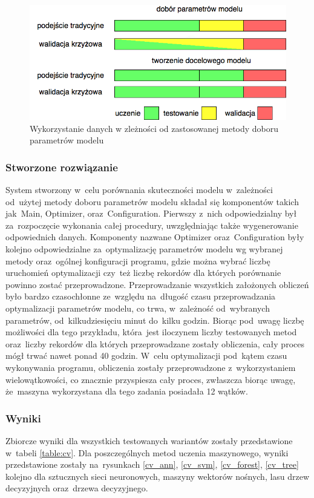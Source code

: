 \begin{figure}[ht!]
\centering
\includegraphics[scale=0.6]{res/cvdata.png}
\caption[Caption for LOF]{Wykorzystanie danych w zleżności od zastosowanej metody doboru parametrów modelu\label{cvdata}}
\end{figure} 

\subsubsection{Stworzone rozwiązanie}
System stworzony w~celu porównania skuteczności modelu w~zależności od~użytej metody doboru parametrów modelu składał się komponentów takich jak~Main, Optimizer, oraz~Configuration. Pierwszy z~nich odpowiedzialny był za~rozpoczęcie wykonania całej procedury, uwzględniając także wygenerowanie odpowiednich danych. Komponenty nazwane Optimizer oraz~Configuration były kolejno odpowiedzialne za~optymalizację parametrów modelu wg wybranej metody oraz~ogólnej konfiguracji programu, gdzie można wybrać liczbę uruchomień optymalizacji czy~też liczbę rekordów dla których porównanie powinno zostać przeprowadzone. Przeprowadzanie wszystkich założonych obliczeń było bardzo czasochłonne ze~względu na~długość czasu przeprowadzania optymalizacji parametrów modelu, co trwa, w~zależność od~wybranych parametrów, od~kilkudziesięciu minut do~kilku godzin. Biorąc pod~uwagę liczbę możliwości dla tego przykładu, która~jest iloczynem liczby testowanych metod oraz~liczby rekordów dla których przeprowadzane zostały obliczenia, cały proces mógł trwać nawet ponad 40 godzin. W~celu optymalizacji pod~kątem czasu wykonywania programu, obliczenia zostały przeprowadzone z~wykorzystaniem wielowątkowości, co znacznie przyspiesza cały proces, zwłaszcza biorąc uwagę, że~maszyna wykorzystana dla tego zadania posiadała 12 wątków. 
 
\subsubsection{Wyniki}
Zbiorcze wyniki dla wszystkich testowanych wariantów zostały przedstawione w~tabeli \ref{table:cv}. Dla poszczególnych metod uczenia maszynowego, wyniki przedstawione zostały na~rysunkach \ref{cv_ann}, \ref{cv_svm}, \ref{cv_forest}, \ref{cv_tree} kolejno dla sztucznych sieci neuronowych, maszyny wektorów nośnych, lasu drzew decyzyjnych oraz~drzewa decyzyjnego.

